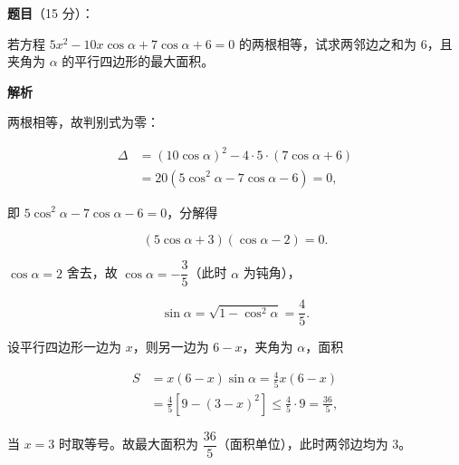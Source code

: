 \begin{answer}

\textbf{题目}（15 分）：

若方程 $5x^2-10x\cos\alpha+7\cos\alpha+6=0$ 的两根相等，试求两邻边之和为 $6$，且夹角为 $\alpha$ 的平行四边形的最大面积。

\textbf{解析}

两根相等，故判别式为零：

\nopagebreak[4]
\[
\begin{aligned}
\Delta&=(10\cos\alpha)^2-4\cdot5\cdot(7\cos\alpha+6)\\
&=20\left(5\cos^2\alpha-7\cos\alpha-6\right)=0,
\end{aligned}
\]

即 $5\cos^2\alpha-7\cos\alpha-6=0$，分解得

\nopagebreak[4]
\[
(5\cos\alpha+3)(\cos\alpha-2)=0.
\]

$\cos\alpha=2$ 舍去，故 $\cos\alpha=-\dfrac35$（此时 $\alpha$ 为钝角），

\nopagebreak[4]
\[
\sin\alpha=\sqrt{1-\cos^2\alpha}=\frac45.
\]

设平行四边形一边为 $x$，则另一边为 $6-x$，夹角为 $\alpha$，面积

\nopagebreak[4]
\[
\begin{aligned}
S&=x(6-x)\sin\alpha=\frac45x(6-x)\\
&=\frac45\left[9-(3-x)^2\right]\le\frac45\cdot 9=\frac{36}{5},
\end{aligned}
\]

当 $x=3$ 时取等号。故最大面积为 $\dfrac{36}{5}$（面积单位），此时两邻边均为 $3$。


\end{answer}
